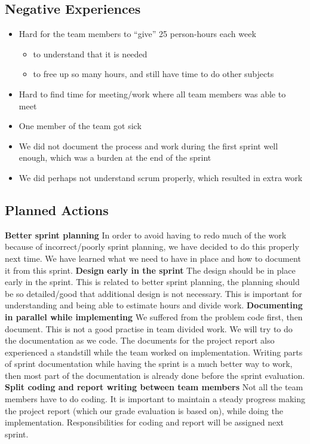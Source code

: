 \subsection{Negative Experiences}
\begin{itemize}
	\item Hard for the team members to “give” 25 person-hours each week
	\begin{itemize}
		\item to understand that it is needed
		\item to free up so many hours, and still have time to do other subjects
	\end{itemize}
	\item Hard to find time for meeting/work where all team members was able to meet
	\item One member of the team got sick
	\item We did not document the process and work during the first sprint well enough, which was a burden at the end of the sprint
	\item We did perhaps not understand scrum properly, which resulted in extra work
\end{itemize}
\subsection{Planned Actions}
\textbf{Better sprint planning} \newline
In order to avoid having to redo much of the work because of incorrect/poorly sprint planning, we have decided to do this properly next time. We have learned what we need to have in place and how to document it from this sprint. \newline
\textbf{Design early in the sprint} \newline
The design should be in place early in the sprint. This is related to better sprint planning, the planning should be so detailed/good that additional design is not necessary. This is important for understanding and being able to estimate hours and divide work. \newline
\textbf{Documenting in parallel while implementing} \newline
We suffered from the problem code first, then document. This is not a good practise in team divided work. We will try to do the documentation as we code.
The documents for the project report also experienced a standstill while the team worked on implementation. Writing parts of sprint documentation while having the sprint is a much better way to work, then most part of the documentation is already done before the sprint evaluation. \newline
\textbf{Split coding and report writing between team members} \newline
Not all the team members have to do coding. It is important to maintain a steady progress making the project report (which our grade evaluation is based on), while doing the implementation. Responsibilities for coding and report will be assigned next sprint. \newline
